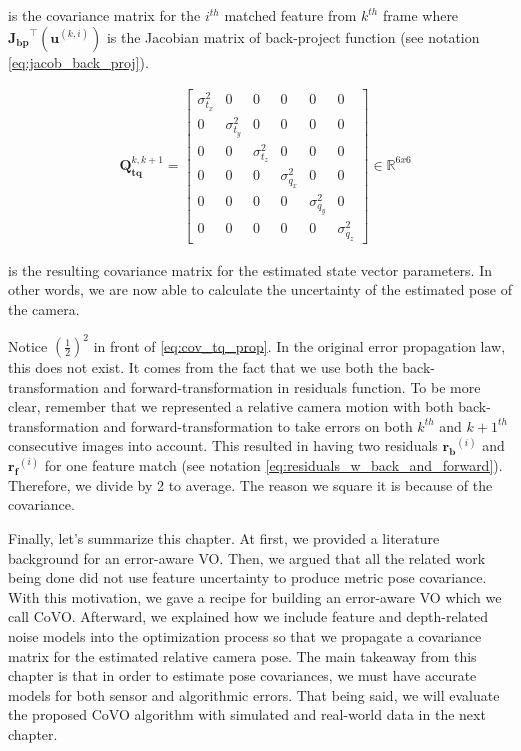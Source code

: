 \documentclass[a4paper]{report}
\numberwithin{figure}{section}
\newcommand{\R}{\mathbb{R}}
\begin{document}
is the covariance matrix for the $i^{th}$ matched feature from $k^{th}$ frame 
where $\mathbf{J_{bp}}^\top(\mathbf{u}^{(k,i)})$ is the Jacobian matrix 
of 
back-project function (see notation \eqref{eq:jacob_back_proj}).

\begin{equation} \begin{aligned} & \mathbf{Q}_{\mathbf{tq}}^{k,k+1}  =
\begin{bmatrix} \sigma_{t_x}^2 & 0 & 0 & 0 & 0 & 0 \\ 0 & \sigma_{t_y}^2 & 0 &
0 & 0 & 0 \\ 0 & 0 & \sigma_{t_z}^2 & 0 & 0 & 0 \\ 0 & 0 & 0 & \sigma_{q_x}^2 &
0 & 0 \\ 0 & 0 & 0 & 0 & \sigma_{q_y}^2 & 0 \\ 0 & 0 & 0 & 0 & 0 &
\sigma_{q_z}^2 \end{bmatrix} \in \R^{6x6} \end{aligned} \end{equation}

is the resulting covariance matrix for the estimated state vector parameters.
In other words, we are now able to calculate the uncertainty of the estimated
pose of the camera.

Notice $(\frac{1}{2})^2$ in front of \eqref{eq:cov_tq_prop}.  In the original
error propagation law, this does not exist.  It comes from the fact that we use
both the back-transformation and forward-transformation in residuals 
function.  To be
more clear, remember that we represented a relative camera motion with both
back-transformation and forward-transformation to take errors on both $k^{th}$ 
and $k+1^{th}$
consecutive images into account. This resulted in having two residuals
$\mathbf{r_b}^{(i)}$ and $\mathbf{r_f}^{(i)}$ for one feature match (see
notation \eqref{eq:residuals_w_back_and_forward}).  Therefore, we divide by 2 
to
average. The reason we square it is because of the covariance.

Finally, let's summarize this chapter. At first, we provided a literature
background for an error-aware VO. Then, we argued that all the related work being
done did not use feature uncertainty to produce metric pose covariance. With
this motivation, we gave a recipe for building an error-aware VO which we call
CoVO. Afterward, we explained how we include feature and depth-related noise 
models
into the optimization process so that we propagate a covariance matrix for the
estimated relative camera pose. 
The main takeaway from this chapter is that in order to estimate 
pose covariances, we must have accurate models for both sensor and 
algorithmic errors. 
That being said, we will evaluate the
proposed CoVO algorithm with simulated and real-world data in the next chapter. 
\end{document}
